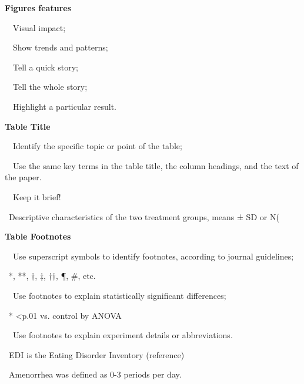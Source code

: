 \documentclass[a4paper, 12pt]{article}
\begin{document}
\textbf{Figures features}
\par\ \textbullet\ Visual impact;
\par\ \textbullet\ Show trends and patterns;
\par\ \textbullet\ Tell a quick story;
\par\ \textbullet\ Tell the whole story;
\par\ \textbullet\ Highlight a particular result.

\textbf{Table Title}
\par\ \textbullet\ Identify the specific topic or point of the table;
\par\ \textbullet\ Use the same key terms in the table title, the column headings, and the text of the paper.
\par\ \textbullet\ Keep it brief!
\par\quad\textopenbullet\ Descriptive characteristics of the two treatment groups, means ± SD or N(%

\textbf{Table Footnotes}
\par\ \textbullet\ Use superscript symbols to identify footnotes, according to journal guidelines;
\par\quad\textopenbullet\ *, **, †, ‡, ††, ¶, \#, etc.
\par\ \textbullet\ Use footnotes to explain statistically significant differences;
\par\quad\textopenbullet\ * \textless p.01 vs. control by ANOVA
\par\ \textbullet\ Use footnotes to explain experiment details or abbreviations.
\par\quad\textopenbullet\ EDI is the Eating Disorder Inventory (reference)
\par\quad\textopenbullet\ Amenorrhea was defined as 0-3 periods per day.
\end{document}
